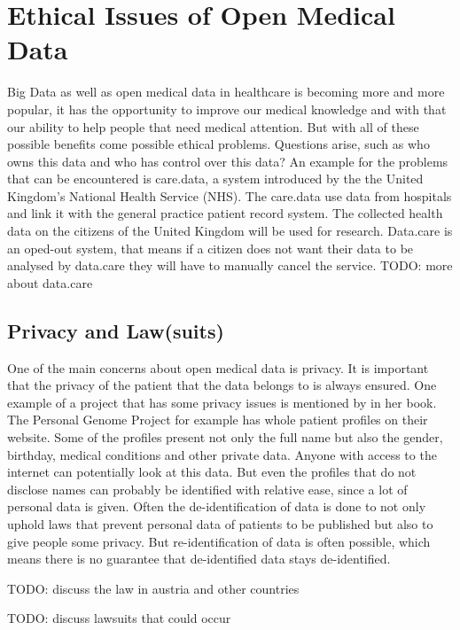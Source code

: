 \documentclass[a4paper, 11pt]{article}
\begin{document}
\section{Ethical Issues of Open Medical Data}\label{sec:ethicalIssues}
Big Data as well as open medical data in healthcare is becoming more and more popular, it has the opportunity to improve our medical knowledge and with that our ability to help people that need medical attention. But with all of these possible benefits come possible ethical problems. Questions arise, such as who owns this data and who has control over this data? An example for the problems that can be encountered is care.data, a system introduced by the the United Kingdom's National Health Service (NHS). \cite{Kostkova_et_al_2016} The care.data use data from hospitals and link it with the general practice patient record system. The collected health data on the citizens of the United Kingdom will be used for research. Data.care is an oped-out system, that means if a citizen does not want their data to be analysed by data.care they will have to manually cancel the service. \cite{Hoeksmag2014}
TODO: more about data.care 

\subsection{Privacy and Law(suits)}
One of the main concerns about open medical data is privacy. It is important that the privacy of the patient that the data belongs to is always ensured. One example of a project that has some privacy issues is mentioned by \citet{Hoffman2015} in her book. The Personal Genome Project for example has whole patient profiles on their website. \cite{ParticipantProfiles} Some of the profiles present not only the full name but also the gender, birthday, medical conditions and other private data. Anyone with access to the internet can potentially look at this data. But even the profiles that do not disclose names can probably be identified with relative ease, since a lot of personal data is given. Often the de-identification of data is done to not only uphold laws that prevent personal data of patients to be published but also to give people some privacy. But re-identification of data is often possible, which means there is no guarantee that de-identified data stays de-identified. \cite{Hoffman2015}\cite{ParticipantProfiles}

TODO: discuss the law in austria and other countries

TODO: discuss lawsuits that could occur
\cite{Hoffman2015}
\end{document}
